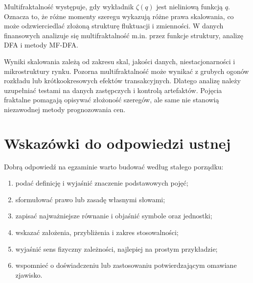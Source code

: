 \documentclass[11pt,a4paper,oneside]{report}
\begin{document}
Multifraktalność występuje, gdy wykładnik \(\zeta(q)\) jest nieliniową funkcją \(q\). Oznacza to, że różne momenty szeregu wykazują różne prawa skalowania, co może odzwierciedlać złożoną strukturę fluktuacji i zmienności. W danych finansowych analizuje się multifraktalność m.in. przez funkcje struktury, analizę DFA i metody MF-DFA.

Wyniki skalowania zależą od zakresu skal, jakości danych, niestacjonarności i mikrostruktury rynku. Pozorna multifraktalność może wynikać z grubych ogonów rozkładu lub krótkookresowych efektów transakcyjnych. Dlatego analizę należy uzupełniać testami na danych zastępczych i kontrolą artefaktów. Pojęcia fraktalne pomagają opisywać złożoność szeregów, ale same nie stanowią niezawodnej metody prognozowania cen.


\chapter*{Wskazówki do odpowiedzi ustnej}
Dobrą odpowiedź na egzaminie warto budować według stałego porządku:
\begin{enumerate}
\item podać definicję i wyjaśnić znaczenie podstawowych pojęć;
\item sformułować prawo lub zasadę własnymi słowami;
\item zapisać najważniejsze równanie i objaśnić symbole oraz jednostki;
\item wskazać założenia, przybliżenia i zakres stosowalności;
\item wyjaśnić sens fizyczny zależności, najlepiej na prostym przykładzie;
\item wspomnieć o doświadczeniu lub zastosowaniu potwierdzającym omawiane zjawisko.
\end{enumerate}
\end{document}
